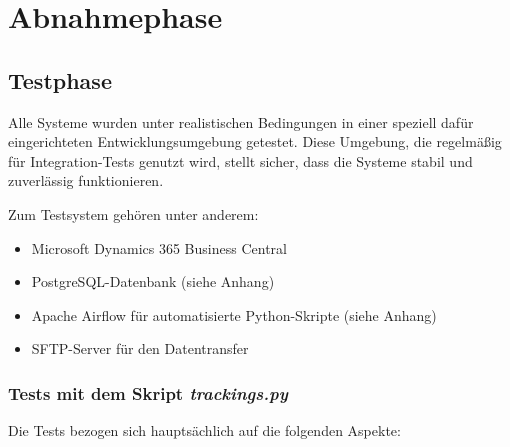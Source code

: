 \section{Abnahmephase}
\label{sec:Abnahmephase}

\subsection{Testphase}
\label{sec:Testphase}
Alle Systeme wurden unter realistischen Bedingungen in einer speziell dafür eingerichteten Entwicklungsumgebung getestet.
Diese Umgebung, die regelmäßig für Integration-Tests genutzt wird, stellt sicher, dass die Systeme stabil und
zuverlässig funktionieren.

Zum Testsystem gehören unter anderem:

\begin{itemize}
	\item Microsoft Dynamics 365 Business Central
	\item PostgreSQL-Datenbank (siehe Anhang)
	\item Apache Airflow für automatisierte Python-Skripte (siehe Anhang)
	\item SFTP-Server für den Datentransfer 
\end{itemize}

\subsubsection{Tests mit dem Skript \textit{trackings.py}}
\label{sec:Tests mit dem Skript trackings.py}

Die Tests bezogen sich hauptsächlich auf die folgenden Aspekte:

